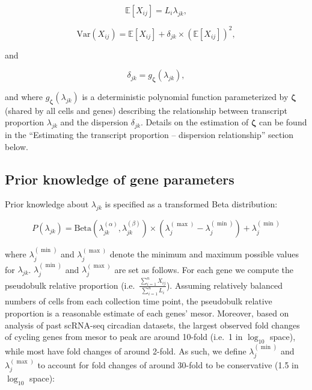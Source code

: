\documentclass[12pt]{article}
\begin{document}
\begin{equation}
\mathbb{E}\!\left[ X_{ij} \right] = L_{i}\lambda_{jk},
\end{equation}

\begin{equation}
\mathrm{Var}\!\left( X_{ij} \right) = \mathbb{E}\!\left[ X_{ij} \right] + \delta_{jk} \times \left( \mathbb{E}\!\left[ X_{ij} \right] \right)^{2},
\end{equation}

and

\begin{equation}
\delta_{jk} = g_{\boldsymbol{\zeta}}\!\left( \lambda_{jk} \right),
\end{equation}

and where $g_{\boldsymbol{\zeta}}\!\left( \lambda_{jk} \right)$ is a deterministic polynomial
function parameterized by $\boldsymbol{\zeta}$ (shared by all cells and genes) describing the
relationship between transcript proportion $\lambda_{jk}$ and the dispersion $\delta_{jk}$. Details
on the estimation of $\boldsymbol{\zeta}$ can be found in the ``Estimating the transcript proportion -- dispersion relationship'' section below.

\subsection*{Prior knowledge of gene parameters}

Prior knowledge about $\lambda_{jk}$ is specified as a transformed Beta distribution:

\begin{equation}
P\!\left( \lambda_{jk} \right) = \mathrm{Beta}\!\left( \lambda_{jk}^{(\alpha)},\lambda_{jk}^{(\beta)} \right) \times \left( \lambda_{j}^{(\max)} - \lambda_{j}^{(\min)} \right) + \lambda_{j}^{(\min)}
\end{equation}

where $\lambda_{j}^{(\min)}$ and $\lambda_{j}^{(\max)}$ denote the minimum and maximum possible
values for $\lambda_{jk}$. $\lambda_{j}^{(\min)}$ and $\lambda_{j}^{(\max)}$ are set as follows. For
each gene we compute the pseudobulk relative proportion (i.e.\ $\frac{\sum_{i=1}^{n}
X_{ij}}{\sum_{i=1}^{n} L_{i}}$). Assuming relatively balanced numbers of cells from each collection
time point, the pseudobulk relative proportion is a reasonable estimate of each genes' mesor.
Moreover, based on analysis of past scRNA-seq circadian datasets, the largest observed fold changes
of cycling genes from mesor to peak are around 10-fold (i.e.\ 1 in $\log_{10}$ space), while most
have fold changes of around 2-fold. As such, we define $\lambda_{j}^{(\min)}$ and
$\lambda_{j}^{(\max)}$ to account for fold changes of around 30-fold to be conservative (1.5 in
$\log_{10}$ space):
\end{document}
